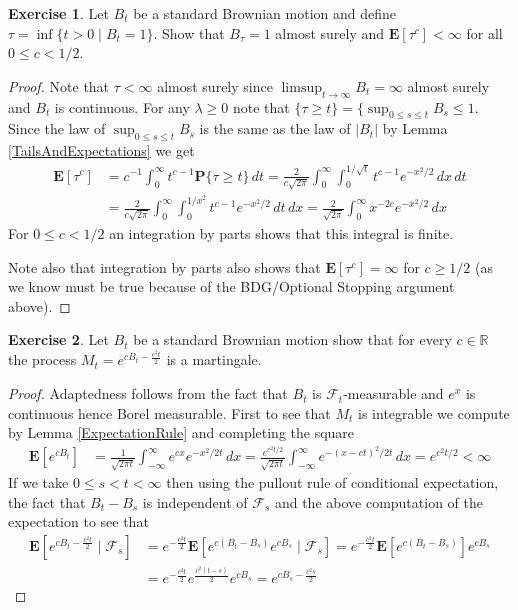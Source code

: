 \documentclass{amsbook}
\theoremstyle{definition}
\newtheorem{xca}{Exercise}
\theoremstyle{remark}
\newcommand{\expectation}[1]{\textbf{E}\left[#1\right]}
\newcommand{\cexpectationlong}[2]{\textbf{E}\left[ #2 \mid #1 \right]}
\newcommand{\probability}[1]{\textbf{P}\{#1\}}
\newcommand{\reals}{\mathbb{R}}
\newcommand{\abs}[1]{\left \vert #1 \right \vert}
\begin{document}
\begin{xca}Let $B_t$ be a standard Brownian motion and define $\tau =
  \inf \lbrace t > 0 \mid B_t = 1 \rbrace$.  Show that
  $B_\tau = 1$ almost surely and $\expectation{\tau^c} < \infty$ for
  all $0 \leq c < 1/2$.
\end{xca}
\begin{proof}
Note that $\tau < \infty$ almost surely since $\limsup_{t \to \infty}
B_t = \infty$ almost surely and $B_t$ is continuous.  For any $\lambda
\geq 0$ note that $ \lbrace \tau \geq t \rbrace = \lbrace
\sup_{0 \leq s \leq t} B_s \leq 1$.  Since the law of $\sup_{0 \leq s
  \leq t} B_s$ is the same as the law of $\abs{B_t}$ by Lemma
\ref{TailsAndExpectations} we get
\begin{align*}
\expectation{\tau^c} &= c^{-1} \int_0^\infty t^{c-1} \probability{\tau
  \geq t} \, dt = \frac{2}{c \sqrt{2\pi}} \int_0^\infty
\int_0^{1/\sqrt{t}}  t^{c-1} e^{-x^2/2} \, dx \, dt \\
&= \frac{2}{c \sqrt{2\pi}} \int_0^\infty
\int_0^{1/x^2}  t^{c-1} e^{-x^2/2} \, dt \, dx = \frac{2}{\sqrt{2\pi}}
\int_0^\infty x^{-2c} e^{-x^2/2} \, dx 
\end{align*}
For $0 \leq c < 1/2$ an integration by parts shows that this integral
is finite.

Note also that integration by parts also shows that
$\expectation{\tau^c} = \infty$ for $c \geq 1/2$ (as we know must be
true because of the BDG/Optional Stopping argument above).
\end{proof}

\begin{xca}Let $B_t$ be a standard Brownian motion show that for every
  $c \in \reals$ the process $M_t = e^{c B_t - \frac{c^2t}{2}}$ is a martingale.
\end{xca}
\begin{proof}
Adaptedness follows from the fact that $B_t$ is
$\mathcal{F}_t$-measurable and $e^x$ is continuous hence Borel
measurable.  First to see that $M_t$ is integrable we compute by Lemma
\ref{ExpectationRule} and completing the
square
\begin{align*}
\expectation{e^{cB_t}} &= \frac{1}{\sqrt{2\pi t}}
\int_{-\infty}^\infty e^{c x} e^{-x^2/2t} \, dx = \frac{ e^{c^2t/2}}{\sqrt{2\pi t}}
\int_{-\infty}^\infty e^{-(x-ct)^2/2t} \, dx = e^{c^2t/2} < \infty
\end{align*}
If we take $0 \leq s < t < \infty$ then using the pullout rule of
conditional expectation, the fact that $B_t -
B_s$ is independent of $\mathcal{F}_s$ and the above computation of
the expectation to see that
\begin{align*}
\cexpectationlong{\mathcal{F}_s}{e^{c B_t - \frac{c^2t}{2}}}
&=e^{- \frac{c^2t}{2}}\cexpectationlong{\mathcal{F}_s}{e^{c (B_t -B_s)} e^{cB_s} } 
= e^{- \frac{c^2t}{2}}\expectation{e^{c (B_t -B_s)}} e^{cB_s} \\
&= e^{- \frac{c^2t}{2} }e^{\frac{c^2(t-s)}{2}}  e^{cB_s} 
= e^{c B_s - \frac{c^2s}{2}}
\end{align*}
\end{proof}
\end{document}
